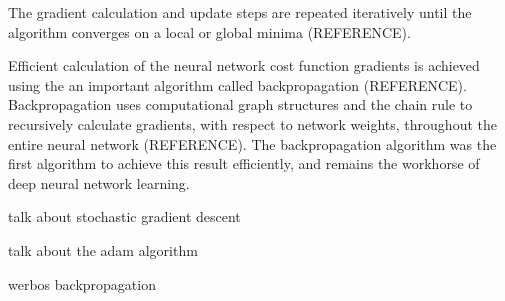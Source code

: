 The gradient calculation and update steps are repeated iteratively until the algorithm converges on a local or global minima (REFERENCE).

Efficient calculation of the neural network cost function gradients is achieved using the an important algorithm called backpropagation (REFERENCE). Backpropagation uses computational graph structures and the chain rule to recursively calculate gradients, with respect to network weights, throughout the entire neural network (REFERENCE). The backpropagation algorithm was the first algorithm to achieve this result efficiently, and remains the workhorse of deep neural network learning.

talk about stochastic gradient descent

talk about the adam algorithm

werbos backpropagation
